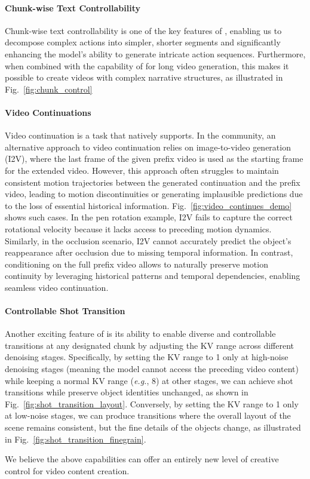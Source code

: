\paragraph{Chunk-wise Text Controllability}
Chunk-wise text controllability is one of the key features of \magi, enabling us to decompose complex actions into simpler, shorter segments and significantly enhancing the model's ability to generate intricate action sequences. Furthermore, when combined with the capability of \magi for long video generation, this makes it possible to create videos with complex narrative structures, as illustrated in Fig.~\ref{fig:chunk_control}


\paragraph{Video Continuations}

Video continuation is a task that \magi natively supports. In the community, an alternative approach to video continuation relies on image-to-video generation (I2V), where the last frame of the given prefix video is used as the starting frame for the extended video. However, this approach often struggles to maintain consistent motion trajectories between the generated continuation and the prefix video, leading to motion discontinuities or generating implausible predictions due to the loss of essential historical information. Fig.~\ref{fig:video_continues_demo} shows such cases. In the pen rotation example, I2V fails to capture the correct rotational velocity because it lacks access to preceding motion dynamics. Similarly, in the occlusion scenario, I2V cannot accurately predict the object's reappearance after occlusion due to missing temporal information. In contrast, conditioning on the full prefix video allows \magi to naturally preserve motion continuity by leveraging historical patterns and temporal dependencies, enabling seamless video continuation.

\paragraph{Controllable Shot Transition}
Another exciting feature of \magi is its ability to enable diverse and controllable transitions at any designated chunk by adjusting the KV range across different denoising stages. Specifically, by setting the KV range to 1 only at high-noise denoising stages (meaning the model cannot access the preceding video content) while keeping a normal KV range (\emph{e.g.}, 8) at other stages, we can achieve shot transitions while preserve object identities unchanged, as shown in Fig.~\ref{fig:shot_transition_layout}.
Conversely, by setting the KV range to 1 only at low-noise stages, we can produce transitions where the overall layout of the scene remains consistent, but the fine details of the objects change, as illustrated in Fig.~\ref{fig:shot_transition_finegrain}.

We believe the above capabilities can offer an entirely new level of creative control for video content creation.


